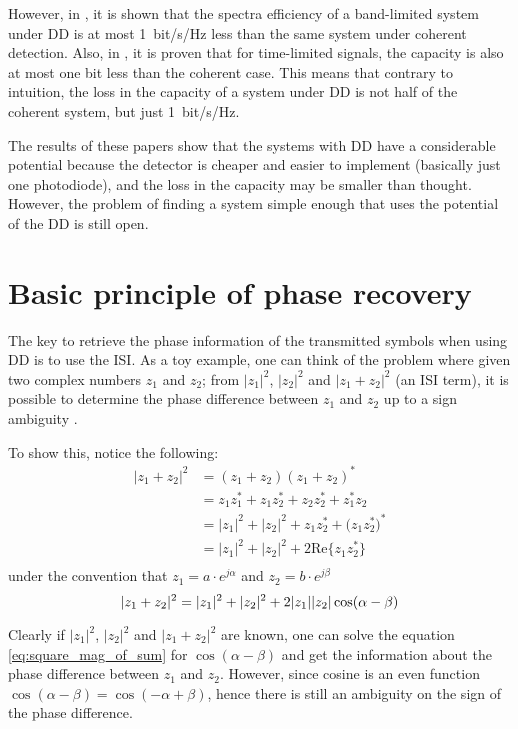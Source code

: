 However, in \cite{Mecozzi_2018}, it is shown that the spectra efficiency of a band-limited system under DD is at most \SI{1}{bit/\s/\Hz} less than the same system under coherent detection. Also, in \cite{Tasbihi_Capacity}, it is proven that for time-limited signals, the capacity is also at most one bit less than the coherent case. This means that contrary to intuition, the loss in the capacity of a system under DD is not half of the coherent system, but just \SI{1}{bit/\s/\Hz}.

The results of these papers show that the systems with DD have a considerable potential because the detector is cheaper and easier to implement (basically just one photodiode), and the loss in the capacity may be smaller than thought. However, the problem of finding a system simple enough that uses the potential of the DD is still open. 



\section{Basic principle of phase recovery}

The key to retrieve the phase information of the transmitted symbols when using DD is to use the ISI. As a toy example, one can think of the problem where given two complex numbers $z_1$ and $z_2$; from $|z_1|^2$, $|z_2|^2$ and $|z_1+z_2|^2$ (an ISI term), it is possible to determine the phase difference between $z_1$ and $z_2$ up to a sign ambiguity \cite{Tasbihi_Tukey}.

To show this, notice the following:
\begin{align*}
	|z_1+z_2|^2 &= (z_1+z_2)(z_1+z_2)^* \\
	&=z_1z_1^*+z_1z_2^*+z_2z_2^*+z_1^*z_2\\
	&=|z_1|^2+|z_2|^2+z_1z_2^*+\bigl(z_1z_2^*\bigr)^*\\
	&=|z_1|^2+|z_2|^2+2\text{Re}\{z_1z_2^*\}\\
\end{align*}
under the convention that $z_1 = a\cdot e^{j\alpha}$ and $z_2 = b\cdot e^{j\beta}$
\begin{equation}
	|z_1+z_2|^2 =|z_1|^2+|z_2|^2+2|z_1||z_2|\cos(\alpha-\beta)\\
	\label{eq:square_mag_of_sum}
\end{equation}

Clearly if $|z_1|^2$, $|z_2|^2$ and $|z_1+z_2|^2$ are known, one can solve the equation \ref{eq:square_mag_of_sum} for $\cos(\alpha-\beta)$ and get the information about the phase difference between $z_1$ and $z_2$. However, since cosine is an even function $\cos(\alpha-\beta)=\cos(-\alpha+\beta)$, hence there is still an ambiguity on the sign of the phase difference.


